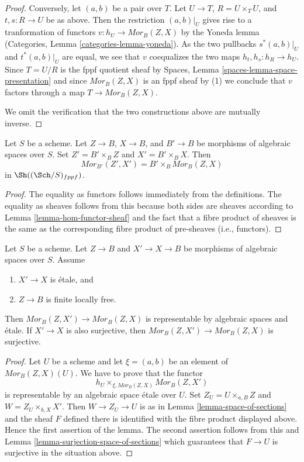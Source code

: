 \begin{proof}
\medskip\noindent
Conversely, let $(a, b)$ be a pair over $T$.
Let $U \to T$, $R = U \times_T U$, and $t, s : R \to U$ be as
above. Then the restriction $(a, b)|_U$ gives rise to a
tranformation of functors $v : h_U \to \mathit{Mor}_B(Z, X)$ by the
Yoneda lemma
(Categories, Lemma \ref{categories-lemma-yoneda}).
As the two pullbacks $s^*(a, b)|_U$ and $t^*(a, b)|_U$
are equal, we see that $v$ coequalizes the two maps
$h_t, h_s : h_R \to h_U$. Since $T = U/R$ is the fppf quotient sheaf by
Spaces, Lemma \ref{spaces-lemma-space-presentation}
and since $\mathit{Mor}_B(Z, X)$ is an fppf sheaf by (1) we conclude
that $v$ factors through a map $T \to \mathit{Mor}_B(Z, X)$.

\medskip\noindent
We omit the verification that the two constructions above are mutually
inverse.
\end{proof}

\begin{lemma}
\label{lemma-base-change-hom-functor}
Let $S$ be a scheme. Let $Z \to B$, $X \to B$, and $B' \to B$
be morphisms of algebraic spaces over $S$. Set $Z' = B' \times_B Z$
and $X' = B' \times_B X$. Then
$$
\mathit{Mor}_{B'}(Z', X')
=
B' \times_B \mathit{Mor}_B(Z, X)
$$
in $\Sh((\Sch/S)_{fppf})$.
\end{lemma}

\begin{proof}
The equality as functors follows immediately from the definitions.
The equality as sheaves follows from this because both sides are
sheaves according to
Lemma \ref{lemma-hom-functor-sheaf}
and the fact that a fibre product of sheaves is the same as the
corresponding fibre product of pre-sheaves (i.e., functors).
\end{proof}

\begin{lemma}
\label{lemma-etale-covering-hom-functor}
Let $S$ be a scheme. Let $Z \to B$ and $X' \to X \to B$ be morphisms of
algebraic spaces over $S$. Assume
\begin{enumerate}
\item $X' \to X$ is \'etale, and
\item $Z \to B$ is finite locally free.
\end{enumerate}
Then $\mathit{Mor}_B(Z, X') \to \mathit{Mor}_B(Z, X)$ is representable
by algebraic spaces and \'etale. If $X' \to X$ is also surjective,
then $\mathit{Mor}_B(Z, X') \to \mathit{Mor}_B(Z, X)$ is surjective.
\end{lemma}

\begin{proof}
Let $U$ be a scheme and let $\xi = (a, b)$ be an element of
$\mathit{Mor}_B(Z, X)(U)$. We have to prove that the functor
$$
h_U \times_{\xi, \mathit{Mor}_B(Z, X)} \mathit{Mor}_B(Z, X')
$$
is representable by an algebraic space \'etale over $U$. Set
$Z_U = U \times_{a, B} Z$ and $W = Z_U \times_{b, X} X'$.
Then $W \to Z_U \to U$ is as in
Lemma \ref{lemma-space-of-sections}
and the sheaf $F$ defined there is identified with the fibre product
displayed above. Hence the first assertion of the lemma.
The second assertion follows from this and
Lemma \ref{lemma-surjection-space-of-sections}
which guarantees that $F \to U$ is surjective in the situation above.
\end{proof}

